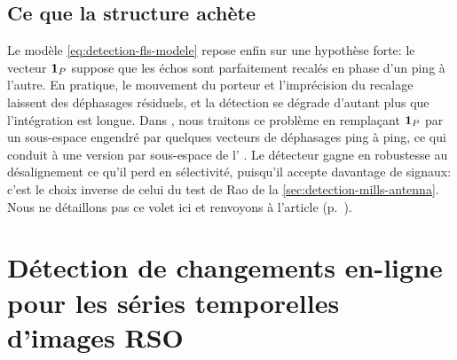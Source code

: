 \subsection{Ce que la structure achète}
\label{subsec:detection-fls-perf}


%

Le modèle \cref{eq:detection-fls-modele} repose enfin sur une hypothèse forte: le vecteur $\boldsymbol{1}_{P}$ suppose que les échos sont parfaitement recalés en phase d'un ping à l'autre. En pratique, le mouvement du porteur et l'imprécision du recalage laissent des déphasages résiduels, et la détection se dégrade d'autant plus que l'intégration est longue. Dans \cite{JOE26}, nous traitons ce problème en remplaçant $\boldsymbol{1}_{P}$ par un sous-espace engendré par quelques vecteurs de déphasages ping à ping, ce qui conduit à une version par sous-espace de l' \cite{Kraut2001,Raghavan2016}. Le détecteur gagne en robustesse au désalignement ce qu'il perd en sélectivité, puisqu'il accepte davantage de signaux: c'est le choix inverse de celui du test de Rao de la \cref{sec:detection-mills-antenna}. Nous ne détaillons pas ce volet ici et renvoyons à l'article (p.~).

\section{Détection de changements en-ligne pour les séries temporelles d'images RSO}
\label{sec:detection-online-change-detection}

